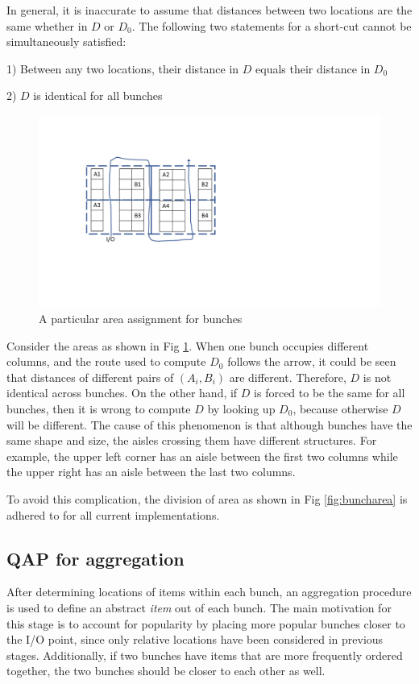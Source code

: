 \documentclass[hyp]{socreport}
\begin{document}
In general, it is inaccurate to assume that distances between two locations are the same whether in $D$ or $D_0$. The following two statements for a short-cut cannot be simultaneously satisfied:\par
1) Between any two locations, their distance in $D$ equals their distance in $D_0$\par
2) $D$ is identical for all bunches\par

\begin{figure}
\includegraphics[scale=0.7]{bunches2}
\centering
\caption{A particular area assignment for bunches}
\label{fig:area}
\end{figure}

Consider the areas as shown in Fig \ref{fig:area}. When one bunch occupies different columns, and the route used to compute $D_0$ follows the arrow, it could be seen that distances of different pairs of $(A_i,B_i)$ are different. Therefore, $D$ is not identical across bunches. On the other hand, if $D$ is forced to be the same for all bunches, then it is wrong to compute $D$ by looking up $D_0$, because otherwise $D$ will be different. The cause of this phenomenon is that although bunches have the same shape and size, the aisles crossing them have different structures. For example, the upper left corner has an aisle between the first two columns while the upper right has an aisle between the last two columns.

To avoid this complication, the division of area as shown in Fig \ref{fig:buncharea} is adhered to for all current implementations.

\subsection{QAP for aggregation}
After determining locations of items within each bunch, an aggregation procedure is used to define an abstract \textit{item} out of each bunch. The main motivation for this stage is to account for popularity by placing more popular bunches closer to the I/O point, since only relative locations have been considered in previous stages. Additionally, if two bunches have items that are more frequently ordered together, the two bunches should be closer to each other as well.
\end{document}

